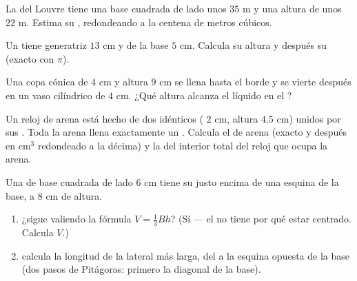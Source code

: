 \begin{exercise}[$\star\star$]\label{exo:g8:solids:7}
La  del Louvre tiene una base cuadrada de lado unos $35$ m y una
altura de unos $22$ m. Estima su , redondeando a la centena de
metros cúbicos.
\end{exercise}

\begin{exercise}[$\star\star$]\label{exo:g8:solids:8}
Un  tiene generatriz $13$ cm y  de la base $5$ cm. Calcula su
altura y después su  (exacto con $\pi$).
\end{exercise}

\begin{exercise}[$\star\star$]\label{exo:g8:solids:9}
Una copa cónica de  $4$ cm y altura $9$ cm se llena hasta el
borde y se vierte después en un vaso cilíndrico de  $4$ cm. ¿Qué
altura alcanza el líquido en el ?
\end{exercise}

\begin{exercise}[$\star\star$]\label{exo:g8:solids:10}
Un reloj de arena está hecho de dos  idénticos ( $2$ cm, altura
$4.5$ cm) unidos por sus . Toda la arena llena exactamente un
. Calcula el  de arena (exacto y después en cm$^3$ redondeado a la
décima) y la  del  interior total del reloj
que ocupa la arena.
\end{exercise}

\begin{exercise}[$\star\star\star$]\label{exo:g8:solids:11}
Una  de base cuadrada de lado $6$ cm tiene su  justo
encima de una esquina de la base, a $8$ cm de altura.
\begin{enumerate}
  \item ¿sigue valiendo la fórmula $V = \frac13 Bh$? (Sí ---
        el  no tiene por qué estar centrado. Calcula $V$.)
  \item calcula la longitud de la  lateral más larga, del 
        a la esquina opuesta de la base (dos pasos de Pitágoras: primero la
        diagonal de la base).
\end{enumerate}
\end{exercise}

